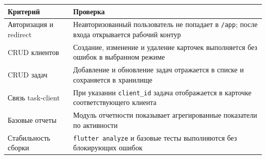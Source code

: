 \begin{longtable}{|p{5.5cm}|p{7.5cm}|}
\hline
\textbf{Критерий} & \textbf{Проверка} \\
\hline
Авторизация и redirect & Неавторизованный пользователь не попадает в \texttt{/app}; после входа открывается рабочий контур \\
\hline
CRUD клиентов & Создание, изменение и удаление карточек выполняется без ошибок в выбранном режиме \\
\hline
CRUD задач & Добавление и обновление задач отражается в списке и сохраняется в хранилище \\
\hline
Связь task-client & При указании \texttt{client\_id} задача отображается в карточке соответствующего клиента \\
\hline
Базовые отчеты & Модуль отчетности показывает агрегированные показатели по активности \\
\hline
Стабильность сборки & \texttt{flutter analyze} и базовые тесты выполняются без блокирующих ошибок \\
\hline
\end{longtable}
